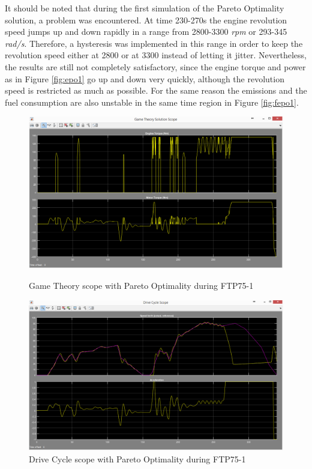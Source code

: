 It should be noted that during the first simulation of the Pareto Optimality solution, a problem was encountered. At time 230-270s the engine revolution speed jumps up and down rapidly in a range from 2800-3300 \textit{rpm} or 293-345 \textit{rad/s}. Therefore, a hysteresis was implemented in this range in order to keep the revolution speed either at 2800 or at 3300 instead of letting it jitter. Nevertheless, the results are still not completely satisfactory, since the engine torque and power as in Figure \ref{fig:epo1} go up and down very quickly, although the revolution speed is restricted as much as possible. For the same reason the emissions and the fuel consumption are also unstable in the same time region in Figure \ref{fig:fepo1}.

\begin{figure}[hp]
\centering
\includegraphics[scale=0.45]{figures/Pareto/FTP75-1/gameTheory30Juni}
\caption{Game Theory scope with Pareto Optimality during FTP75-1}
\label{fig:gtpo1}
\includegraphics[scale=0.41]{figures/Pareto/FTP75-1/driveCycle30Juni}
\caption{Drive Cycle scope with Pareto Optimality during FTP75-1}
\label{fig:dcpo1}
\end{figure}


